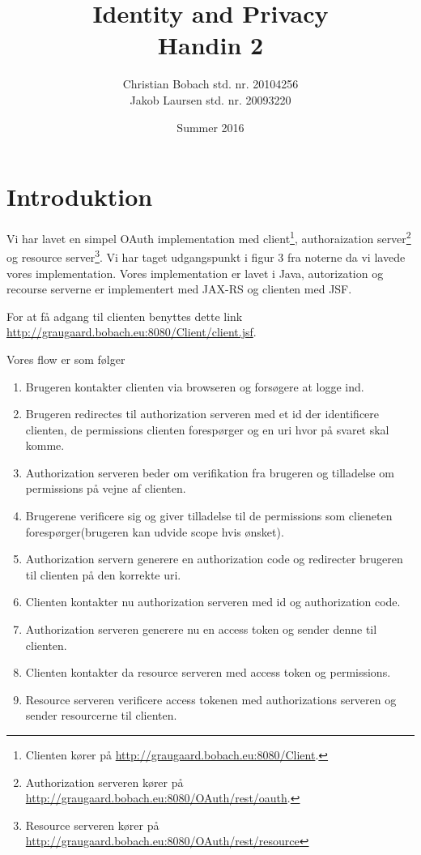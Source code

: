 \documentclass[a4paper,12pt]{article}
\title{Identity and Privacy \\Handin 2}
\author{Christian Bobach std. nr. 20104256\\Jakob Laursen std. nr. 20093220}
\date{Summer 2016}
\theoremstyle{plain}
\theoremstyle{nonumberplain}
\begin{document}
\maketitle
\section*{Introduktion}

Vi har lavet en simpel OAuth implementation med client\footnote{Clienten kører på \url{http://graugaard.bobach.eu:8080/Client}.}, authoraization server\footnote{Authorization serveren kører på \url{http://graugaard.bobach.eu:8080/OAuth/rest/oauth}.} og resource server\footnote{Resource serveren kører på \url{http://graugaard.bobach.eu:8080/OAuth/rest/resource}}. Vi har taget udgangspunkt i figur 3 fra noterne\cite{iogp}  da vi lavede vores implementation. Vores implementation er lavet i Java, autorization og recourse serverne er implementert med JAX-RS og clienten med JSF.

For at få adgang til clienten benyttes dette link \url{http://graugaard.bobach.eu:8080/Client/client.jsf}.

Vores flow er som følger
\begin{enumerate}
    \item Brugeren kontakter clienten via browseren og forsøgere at logge ind.
    \item Brugeren redirectes til authorization serveren med et id der identificere clienten, de permissions clienten forespørger og en uri hvor på svaret skal komme.
    \item Authorization serveren beder om verifikation fra brugeren og tilladelse om permissions på vejne af clienten.
    \item Brugerene verificere sig og giver tilladelse til de permissions som clieneten forespørger(brugeren kan udvide scope hvis ønsket).
    \item Authorization servern generere en authorization code og redirecter brugeren til clienten på den korrekte uri.
    \item Clienten kontakter nu authorization serveren med id og authorization code.
    \item Authorization serveren generere nu en access token og sender denne til clienten.
    \item Clienten kontakter da resource serveren med access token og permissions.
    \item Resource serveren verificere access tokenen med authorizations serveren og sender resourcerne til clienten.
\end{enumerate}
\end{document}
